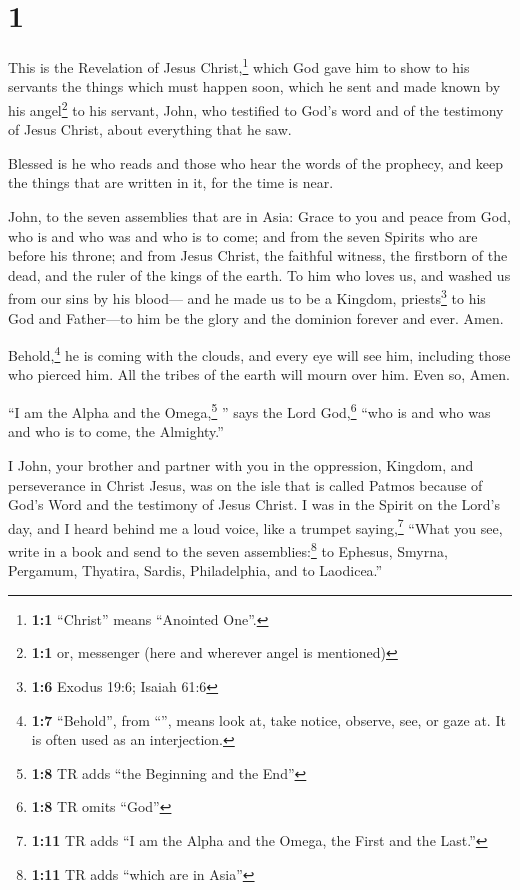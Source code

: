 \hypertarget{section}{%
\section{1}\label{section}}

 This is the Revelation of Jesus Christ,\footnote{\textbf{1:1}
  ``Christ'' means ``Anointed One''.} which God gave him to show to his
servants the things which must happen soon, which he sent and made known
by his angel\footnote{\textbf{1:1} or, messenger (here and wherever
  angel is mentioned)} to his servant, John,  who
testified to God's word and of the testimony of Jesus Christ, about
everything that he saw.

 Blessed is he who reads and those who hear the words of
the prophecy, and keep the things that are written in it, for the time
is near.

 John, to the seven assemblies that are in Asia: Grace to
you and peace from God, who is and who was and who is to come; and from
the seven Spirits who are before his throne;  and from
Jesus Christ, the faithful witness, the firstborn of the dead, and the
ruler of the kings of the earth. To him who loves us, and washed us from
our sins by his blood---  and he made us to be a Kingdom,
priests\footnote{\textbf{1:6} Exodus 19:6; Isaiah 61:6} to his God and
Father---to him be the glory and the dominion forever and ever. Amen.

 Behold,\footnote{\textbf{1:7} ``Behold'', from
  ``'', means look at, take notice, observe, see, or gaze
  at. It is often used as an interjection.} he is coming with the
clouds, and every eye will see him, including those who pierced him. All
the tribes of the earth will mourn over him. Even so, Amen.

 ``I am the Alpha and the Omega,\footnote{\textbf{1:8} TR
  adds ``the Beginning and the End''} '' says the Lord God,\footnote{\textbf{1:8}
  TR omits ``God''} ``who is and who was and who is to come, the
Almighty.''

 I John, your brother and partner with you in the
oppression, Kingdom, and perseverance in Christ Jesus, was on the isle
that is called Patmos because of God's Word and the testimony of Jesus
Christ.  I was in the Spirit on the Lord's day, and I
heard behind me a loud voice, like a trumpet 
saying,\footnote{\textbf{1:11} TR adds ``I am the Alpha and the Omega,
  the First and the Last.''} ``What you see, write in a book and send to
the seven assemblies:\footnote{\textbf{1:11} TR adds ``which are in
  Asia''} to Ephesus, Smyrna, Pergamum, Thyatira, Sardis, Philadelphia,
and to Laodicea.''

